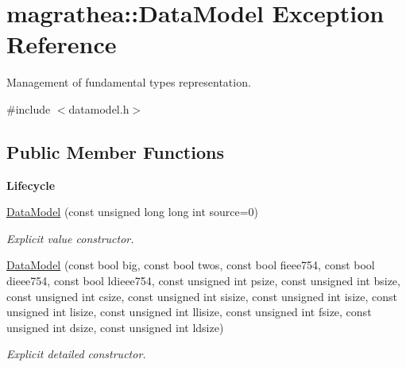 \hypertarget{exceptionmagrathea_1_1DataModel}{\section{magrathea\-:\-:Data\-Model Exception Reference}
\label{exceptionmagrathea_1_1DataModel}
}


Management of fundamental types representation.  




{\ttfamily \#include $<$datamodel.\-h$>$}

\subsection*{Public Member Functions}
\begin{Indent}{\bf Lifecycle}\par
\begin{DoxyCompactItemize}
\item 
\hyperlink{exceptionmagrathea_1_1DataModel_ac94861dfefb3ad45c592ad61e73307a0}{Data\-Model} (const unsigned long long int source=0)
\begin{DoxyCompactList}\small\item\em Explicit value constructor. \end{DoxyCompactList}\item 
\hyperlink{exceptionmagrathea_1_1DataModel_a23d5a4932ec97532cfd0ac404d5ca038}{Data\-Model} (const bool big, const bool twos, const bool fieee754, const bool dieee754, const bool ldieee754, const unsigned int psize, const unsigned int bsize, const unsigned int csize, const unsigned int sisize, const unsigned int isize, const unsigned int lisize, const unsigned int llisize, const unsigned int fsize, const unsigned int dsize, const unsigned int ldsize)
\begin{DoxyCompactList}\small\item\em Explicit detailed constructor. \end{DoxyCompactList}\end{DoxyCompactItemize}
\end{Indent}
